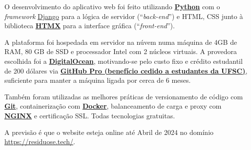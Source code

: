 O desenvolvimento do aplicativo web foi feito utilizando \href{https://www.python.org/}{\textbf{Python}} com o \textit{framework} \href{https://www.djangoproject.com/}{Django} para a lógica de servidor (“\textit{back-end}”) e \gls{HTML}, \gls{CSS} junto à biblioteca \href{https://htmx.org/}{\textbf{HTMX}} para a interface gráfica (“\textit{front-end}”).

A plataforma foi hospedada em servidor na núvem numa máquina de 4GB de \gls{RAM}, 80 GB de \gls{SSD} e processador Intel com 2 núcleos virtuais. A provedora escolhida foi a \href{https://www.digitalocean.com/}{\textbf{DigitalOcean}}, motivando-se pelo custo fixo e crédito estudantil de 200 dólares via \href{https://education.github.com/pack}{\textbf{GitHub Pro (benefício cedido a estudantes da UFSC)}}, suficiente para manter a máquina ligada por cerca de 6 meses.

Também foram utilizadas as melhores práticas de versionamento de código com \href{https://git-scm.com/}{\textbf{Git}}, containerização com \href{https://www.docker.com/}{\textbf{Docker}}, balanceamento de carga e proxy com \href{https://www.nginx.com/}{\textbf{NGINX}} e certificação \gls{SSL}. Todas tecnologias gratuitas.

A previsão é que o website esteja online até Abril de 2024 no domínio \url{https://residuose.tech/}.